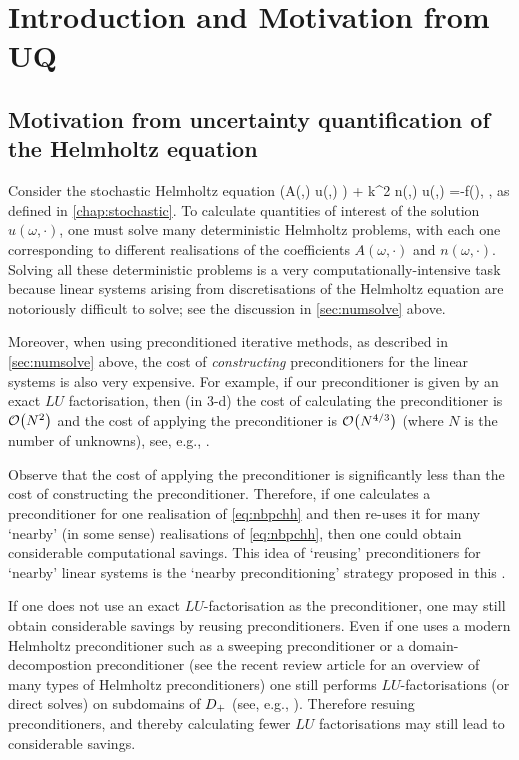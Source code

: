 \section{Introduction and Motivation from UQ}\label{sec:intronbpc}

\subsection{Motivation from uncertainty quantification of the Helmholtz equation} 
Consider the stochastic Helmholtz equation 
\beq\label{eq:nbpchh}
\nabla\cdot\big(A(\omega,\bx) \nabla u(\omega,\bx) \big) + k^2 n(\omega,\bx) u(\omega,\bx) =-f(\bx), \quad \bx\in\Dp,
\eeq
as defined in \cref{chap:stochastic}. To calculate quantities of interest of the solution $u(\omega,\cdot)$, one must solve many deterministic Helmholtz problems, with each one corresponding to different realisations of the coefficients $A(\omega,\cdot)$ and $n(\omega,\cdot)$.
Solving all these deterministic problems is a very computationally-intensive task because linear systems arising from discretisations of the Helmholtz equation are notoriously difficult to solve; see the discussion in \cref{sec:numsolve} above.

Moreover, when using preconditioned iterative methods, as described in \cref{sec:numsolve} above, the cost of \emph{constructing} preconditioners for the linear systems is also very expensive. For example, if our preconditioner is given by an exact $LU$ factorisation, then (in 3-d) the cost of calculating the preconditioner is $\cO\mleft(N^2\mright)$ and the cost of applying the preconditioner is $\cO\mleft(N^{4/3}\mright)$ (where $N$ is the number of unknowns), see, e.g., \cite[Section 4]{GaZh:19}.

Observe that the cost of applying the preconditioner is significantly less than the cost of constructing the preconditioner. Therefore, if one calculates a preconditioner for one realisation of \cref{eq:nbpchh} and then re-uses it for many `nearby' (in some sense) realisations of \cref{eq:nbpchh}, then one could obtain considerable computational savings. This idea of `reusing' preconditioners for `nearby' linear systems is the `nearby preconditioning' strategy proposed in this .

If one does not use an exact $LU$-factorisation as the preconditioner, one may still obtain considerable savings by reusing preconditioners. Even if one uses a modern Helmholtz preconditioner such as a sweeping preconditioner or a domain-decompostion preconditioner (see the recent review article \cite{GaZh:19} for an overview of many types of Helmholtz preconditioners) one still performs $LU$-factorisations (or direct solves) on subdomains of $D_{+}$ (see, e.g., \cite[Section 2]{GaZh:19}). Therefore resuing preconditioners, and thereby calculating fewer $LU$ factorisations may still lead to considerable savings.

